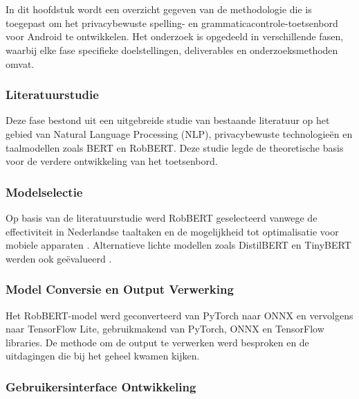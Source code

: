 
\chapter{}%
\label{ch:methodologie}

In dit hoofdstuk wordt een overzicht gegeven van de methodologie die is toegepast om het privacybewuste spelling- en grammaticacontrole-toetsenbord voor Android te ontwikkelen. Het onderzoek is opgedeeld in verschillende fasen, waarbij elke fase specifieke doelstellingen, deliverables en onderzoeksmethoden omvat.

\subsection{Literatuurstudie}

Deze fase bestond uit een uitgebreide studie van bestaande literatuur op het gebied van Natural Language Processing (NLP), privacybewuste technologieën en taalmodellen zoals BERT en RobBERT. Deze studie legde de theoretische basis voor de verdere ontwikkeling van het toetsenbord.

\subsection{Modelselectie}

Op basis van de literatuurstudie werd RobBERT geselecteerd vanwege de effectiviteit in Nederlandse taaltaken en de mogelijkheid tot optimalisatie voor mobiele apparaten \autocite{Delobelle2020}. Alternatieve lichte modellen zoals DistilBERT en TinyBERT werden ook geëvalueerd \autocite{Sanh2019DistilBERT}.

\subsection{Model Conversie en Output Verwerking}

Het RobBERT-model werd geconverteerd van PyTorch naar ONNX en vervolgens naar TensorFlow Lite, gebruikmakend van PyTorch, ONNX en TensorFlow libraries. De methode om de output te verwerken werd besproken en de uitdagingen die bij het geheel kwamen kijken.

\subsection{Gebruikersinterface Ontwikkeling}

